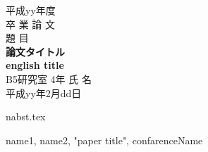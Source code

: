 \documentclass[12pt,twoside]{jreport}  %
\begin{document}
\begin{titlepage}
\parindent=0in
\begin{center}
\Large
\vspace*{3zh}
平成yy年度\\
卒 業 論 文\\
\vspace*{3zh}
題 目 \\
{\LARGE\bf
論文タイトル\\
english title\\
}
\vspace*{3zh}
B5研究室 4年 氏 名\\[1cm]
平成yy年2月dd日\\
\vspace*{5mm}
\end{center}
\end{titlepage}

\setcounter{page}{1}   %
\tableofcontents       %
\listoffigures         %
\listoftables          %
\newpage


\setcounter{page}{1}     %

\setlength{}{20pt}

n{abst.tex}

% 





\newpage

\begin{thebibliography}{99}%
 name1, name2, "paper title", confarenceName
\end{thebibliography}
\end{document}
